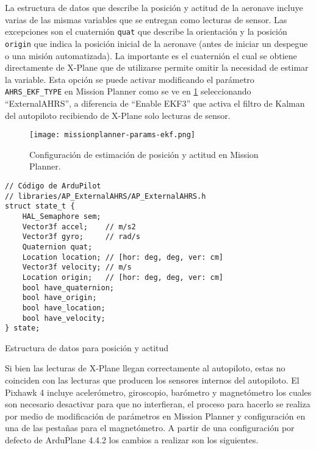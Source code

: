 La estructura de datos que describe la posición y actitud de la aeronave incluye varias de las mismas variables que se entregan como lecturas de sensor. Las excepciones son el cuaternión \texttt{quat} que describe la orientación y la posición \texttt{origin} que indica la posición inicial de la aeronave (antes de iniciar un despegue o una misión automatizada). La importante es el cuaternión el cual se obtiene directamente de X-Plane que de utilizarse permite omitir la necesidad de estimar la variable. Esta opción se puede activar modificando el parámetro \texttt{AHRS\_EKF\_TYPE} en Mission Planner como se ve en \cref{fig:missionplanner-params-ekf} seleccionando ``ExternalAHRS'', a diferencia de ``Enable EKF3'' que activa el filtro de Kalman del autopiloto recibiendo de X-Plane solo lecturas de sensor.

\begin{figure}[h]
    \centering
    \texttt{[image: missionplanner-params-ekf.png]}
    \caption{Configuración de estimación de posición y actitud en Mission Planner.}
    \label{fig:missionplanner-params-ekf}
\end{figure}

\begin{listing}[h]
    \begin{verbatim}
// Código de ArduPilot
// libraries/AP_ExternalAHRS/AP_ExternalAHRS.h
struct state_t {
    HAL_Semaphore sem;
    Vector3f accel;    // m/s2
    Vector3f gyro;     // rad/s
    Quaternion quat;
    Location location; // [hor: deg, deg, ver: cm]
    Vector3f velocity; // m/s  
    Location origin;   // [hor: deg, deg, ver: cm]
    bool have_quaternion;
    bool have_origin;
    bool have_location;
    bool have_velocity;
} state;
    \end{verbatim}
    \caption{Estructura de datos para posición y actitud}
    \label{lst:ap-structs-2}
\end{listing}

Si bien las lecturas de X-Plane llegan correctamente al autopiloto, estas no coinciden con las lecturas que producen los sensores internos del autopiloto. El Pixhawk 4 incluye acelerómetro, giroscopio, barómetro y magnetómetro los cuales son necesario desactivar para que no interfieran, el proceso para hacerlo se realiza por medio de modificación de parámetros en Mission Planner y configuración en una de las pestañas para el magnetómetro. A partir de una configuración por defecto de ArduPlane 4.4.2 los cambios a realizar son los siguientes.

